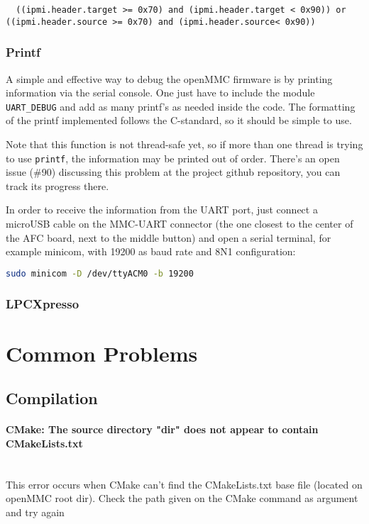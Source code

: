 \documentclass[letterpaper,12pt, titlepage]{article}
\newcommand{\newparagraph}[1]{\paragraph{#1}\mbox{}\\}
\begin{document}
\begin{lstlisting}
  ((ipmi.header.target >= 0x70) and (ipmi.header.target < 0x90)) or ((ipmi.header.source >= 0x70) and (ipmi.header.source< 0x90))
\end{lstlisting}


\subsubsection{Printf}
A simple and effective way to debug the openMMC firmware is by printing information via the serial console. One just have to include the module \texttt{UART\_DEBUG} and add as many printf's as needed inside the code. The formatting of the printf implemented follows the C-standard, so it should be simple to use.

Note that this function is not thread-safe yet, so if more than one thread is trying to use \texttt{printf}, the information may be printed out of order. There's an open issue (\#90) discussing this problem at the project github repository, you can track its progress there.

In order to receive the information from the UART port, just connect a microUSB cable on the MMC-UART connector (the one closest to the center of the AFC board, next to the middle button) and open a serial terminal, for example minicom, with 19200 as baud rate and 8N1 configuration:

\begin{lstlisting}[language=bash]
  sudo minicom -D /dev/ttyACM0 -b 19200
\end{lstlisting}

\subsubsection{LPCXpresso}

\section{Common Problems}

\subsection{Compilation}

\newparagraph{CMake: The source directory "dir" does not appear to contain CMakeLists.txt}
This error occurs when CMake can't find the CMakeLists.txt base file (located on openMMC root dir). Check the path given on the CMake command as argument and try again
\end{document}
